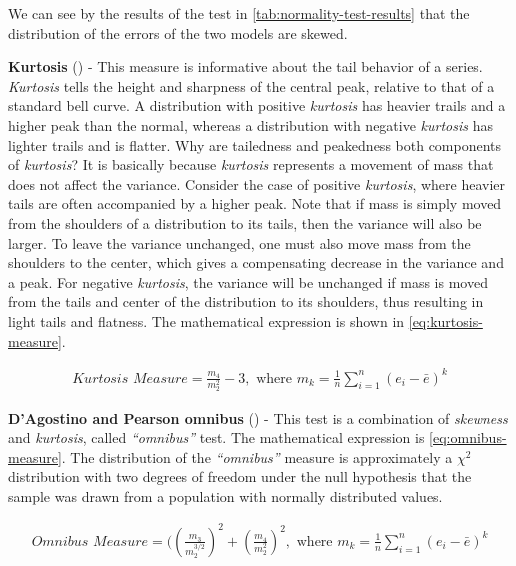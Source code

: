 We can see by the results of the test in
\autoref{tab:normality-test-results} that the distribution of the
errors of the two models are skewed.

\textbf{Kurtosis} (\cite{anscombe1983distribution}) - This measure is
informative about the tail behavior of a series. \textit{Kurtosis}
tells the height and sharpness of the central peak, relative to that
of a standard bell curve. A distribution with positive
\textit{kurtosis} has heavier trails and a higher peak than the
normal, whereas a distribution with negative \textit{kurtosis} has
lighter trails and is flatter. Why are tailedness and peakedness both
components of \textit{kurtosis}? It is basically because
\textit{kurtosis} represents a movement of mass that does not affect
the variance. Consider the case of positive \textit{kurtosis}, where
heavier tails are often accompanied by a higher peak. Note that if
mass is simply moved from the shoulders of a distribution to its
tails, then the variance will also be larger. To leave the variance
unchanged, one must also move mass from the shoulders to the center,
which gives a compensating decrease in the variance and a peak. For
negative \textit{kurtosis}, the variance will be unchanged if mass is
moved from the tails and center of the distribution to its shoulders,
thus resulting in light tails and flatness. The mathematical
expression is shown in \autoref{eq:kurtosis-measure}.

\begin{equation}
  \begin{aligned}
    \label{eq:kurtosis-measure}
    \textit{Kurtosis Measure} = \frac{m_4}{m_2^2} - 3, \text{ where }
    m_k = \frac{1}{n} \displaystyle\sum_{i=1}^n (e_i - \bar{e})^k
  \end{aligned}
\end{equation}

\textbf{D’Agostino and Pearson omnibus} (\cite{d1971omnibus,
d1973tests}) - This test is a combination of \textit{skewness} and
\textit{kurtosis}, called \textit{``omnibus''} test. The mathematical
expression is \autoref{eq:omnibus-measure}. The distribution of the
\textit{``omnibus''} measure is approximately a $\chi^2$ distribution
with two degrees of freedom under the null hypothesis that the sample
was drawn from a population with normally distributed values.

\begin{equation}
  \begin{aligned}
    \label{eq:omnibus-measure}
    \textit{Omnibus Measure} =
    ((\frac{m_3}{m_2^{3/2}})^2 + (\frac{m_4}{m_2^2})^2, \text{ where }
    m_k = \frac{1}{n} \displaystyle\sum_{i=1}^n (e_i - \bar{e} )^k
  \end{aligned}
\end{equation}

